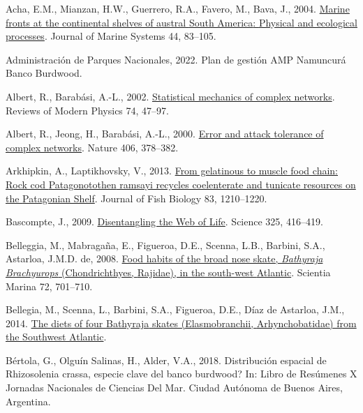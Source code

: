 \documentclass[preprint, 3p,
authoryear]{elsarticle} %
\newlength{\cslhangindent}
\newlength{\cslentryspacingunit} %
\newenvironment{CSLReferences}[2] %
 {%
  \setlength{\parindent}{0pt}
  \ifodd #1
  \let\oldpar\par
  \def\par{\hangindent=\cslhangindent\oldpar}
  \fi
  \setlength{\parskip}{#2\cslentryspacingunit}
 }%
 {}
\begin{document}
\hypertarget{refs}{}
\begin{CSLReferences}{1}{0}
\leavevmode{}%
Acha, E.M., Mianzan, H.W., Guerrero, R.A., Favero, M., Bava, J., 2004.
\href{https://doi.org/10.1016/j.jmarsys.2003.09.005}{Marine fronts at
the continental shelves of austral {South America}: {Physical} and
ecological processes}. Journal of Marine Systems 44, 83--105.

\leavevmode{}%
Administración de Parques Nacionales, 2022. {Plan de gestión AMP
Namuncurá Banco Burdwood}.

\leavevmode{}%
Albert, R., Barabási, A.-L., 2002.
\href{https://doi.org/10.1103/RevModPhys.74.47}{Statistical mechanics of
complex networks}. Reviews of Modern Physics 74, 47--97.

\leavevmode{}%
Albert, R., Jeong, H., Barabási, A.-L., 2000.
\href{https://doi.org/10.1038/35019019}{Error and attack tolerance of
complex networks}. Nature 406, 378--382.

\leavevmode{}%
Arkhipkin, A., Laptikhovsky, V., 2013.
\href{https://doi.org/10.1111/jfb.12217}{From gelatinous to muscle food
chain: Rock cod {Patagonotothen} ramsayi recycles coelenterate and
tunicate resources on the {Patagonian Shelf}}. Journal of Fish Biology
83, 1210--1220.

\leavevmode{}%
Bascompte, J., 2009.
\href{https://doi.org/10.1126/science.1170749}{Disentangling the {Web}
of {Life}}. Science 325, 416--419.

\leavevmode{}%
Belleggia, M., Mabragaña, E., Figueroa, D.E., Scenna, L.B., Barbini,
S.A., Astarloa, J.M.D. de, 2008.
\href{https://doi.org/10.3989/scimar.2008.72n4701}{Food habits of the
broad nose skate, {\emph{Bathyraja}}{ \emph{Brachyurops}}
({Chondrichthyes}, {Rajidae}), in the south-west {Atlantic}}. Scientia
Marina 72, 701--710.

\leavevmode{}%
Bellegia, M., Scenna, L., Barbini, S.A., Figueroa, D.E., Díaz de
Astarloa, J.M., 2014.
\href{https://doi.org/10.26028/CYBIUM/2014-384-012}{The diets of four
{Bathyraja} skates ({Elasmobranchii}, {Arhynchobatidae}) from the
{Southwest Atlantic}}.

\leavevmode{}%
Bértola, G., Olguín Salinas, H., Alder, V.A., 2018. Distribución
espacial de {Rhizosolenia} crassa, \textquestiondown especie clave del
banco burdwood? In: Libro de Resúmenes {X Jornadas Nacionales} de
{Ciencias} Del {Mar}. {Ciudad Autónoma de Buenos Aires, Argentina}.


\end{CSLReferences}
\end{document}
